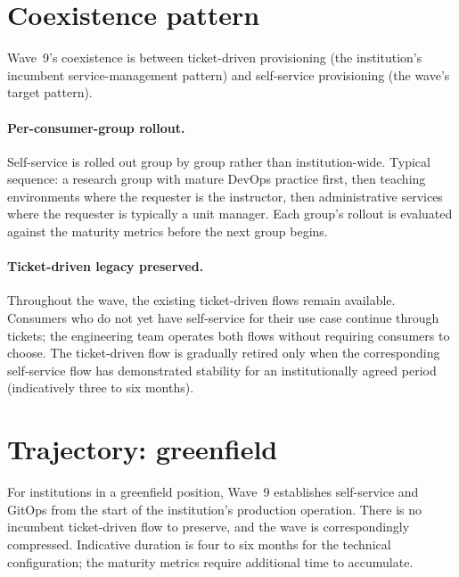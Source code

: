 \section{Coexistence pattern}
\label{sec:w9-coexistence}

Wave~9's coexistence is between ticket-driven provisioning
(the institution's incumbent service-management pattern) and
self-service provisioning (the wave's target pattern).

\paragraph{Per-consumer-group rollout.} Self-service is rolled
out group by group rather than institution-wide. Typical
sequence: a research group with mature DevOps practice first,
then teaching environments where the requester is the
instructor, then administrative services where the requester is
typically a unit manager. Each group's rollout is evaluated
against the maturity metrics before the next group begins.

\paragraph{Ticket-driven legacy preserved.} Throughout the wave,
the existing ticket-driven flows remain available. Consumers
who do not yet have self-service for their use case continue
through tickets; the engineering team operates both flows
without requiring consumers to choose. The ticket-driven flow
is gradually retired only when the corresponding self-service
flow has demonstrated stability for an institutionally agreed
period (indicatively three to six months).

\section{Trajectory: greenfield}
\label{sec:w9-greenfield}

For institutions in a greenfield position, Wave~9 establishes
self-service and GitOps from the start of the institution's
production operation. There is no incumbent ticket-driven flow
to preserve, and the wave is correspondingly compressed.
Indicative duration is four to six months for the technical
configuration; the maturity metrics require additional time to
accumulate.

